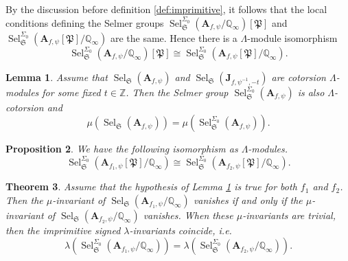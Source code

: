 \documentclass[10pt,a4paper]{amsart}
\newtheorem{theorem}{Theorem}
\newtheorem{lemma}[theorem]{Lemma}
\newtheorem{proposition}[theorem]{Proposition}
\newcommand{\Q}{\mathbb{Q}}
\newcommand{\Z}{\mathbb{Z}}
\newcommand{\fS}{\mathfrak{S}}
\newcommand{\bJ}{\mathbf{J}}
\newcommand{\bA}{\mathbf{A}}
\newcommand{\Sel}{\operatorname{Sel}}
\begin{document}
By the discussion before definition \ref{def:imprimitive}, it follows that the local conditions defining the Selmer groups $\Sel_{\fS}^{\Sigma_0}(\bA_{f,\psi}/\Q_\infty)[\mathfrak{P}]$ and $ \Sel_{\fS}^{\Sigma_0}(\bA_{f,\psi}[\mathfrak{P}]/\Q_\infty)$ are the same. Hence there is a $\Lambda$-module isomorphism 
\begin{equation}\label{eq:jishnu18}
    \Sel_{\fS}^{\Sigma_0}(\bA_{f,\psi}/\Q_\infty)[\mathfrak{P}] \cong  \Sel_{\fS}^{\Sigma_0}(\bA_{f,\psi}[\mathfrak{P}]/\Q_\infty).
\end{equation}
\begin{lemma}\label{lem:4.9}
    Assume that $\Sel_{\fS}(\bA_{f, \psi})$ and $\Sel_{\fS}(\bJ_{f, \psi^{-1},-t})$ are cotorsion $\Lambda$-modules for some fixed $t\in \Z$. Then the Selmer group $\Sel^{\Sigma_0}_{\fS}(\bA_{f, \psi})$ is also $\Lambda$-cotorsion and 
     $$\mu(\Sel_{\fS}(\bA_{f, \psi})) =\mu(\Sel^{\Sigma_0}_{\fS}(\bA_{f, \psi})).$$
\end{lemma}

\begin{proposition}\label{prop:congprop}
    We have the following isomorphism as $\Lambda$-modules.
    $$\Sel_{\fS}^{\Sigma_0}(\bA_{f_1, \psi}[\mathfrak{P}]/\Q_\infty)\cong \Sel_{\fS}^{\Sigma_0}(\bA_{f_2, \psi}[\mathfrak{P}]/\Q_\infty).$$
\end{proposition}

\begin{theorem}\label{prop: lambda}
Assume that the hypothesis of Lemma \ref{lem:4.9} is true for both $f_1$ and $f_2$.  Then the $\mu$-invariant of $\Sel_{\fS}(\bA_{f_1, \psi}/\Q_\infty)$ vanishes if and only if the $\mu$-invariant of $\Sel_{\fS}(\bA_{f_2, \psi}/\Q_\infty)$ vanishes. When these $\mu$-invariants are trivial, then the imprimitive signed $\lambda$-invariants coincide, i.e. 
$$\lambda (\Sel^{\Sigma_0}_{\fS}(\bA_{f_1, \psi}/\Q_\infty))=\lambda (\Sel^{\Sigma_0}_{\fS}(\bA_{f_2, \psi}/\Q_\infty)).$$
\end{theorem}
\end{document}
